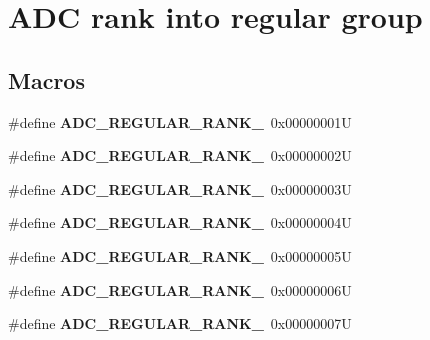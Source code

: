 \hypertarget{group___a_d_c__regular__rank}{}\section{A\+DC rank into regular group}
\label{group___a_d_c__regular__rank}
\subsection*{Macros}
\begin{DoxyCompactItemize}
\item 
\mbox{\label{group___a_d_c__regular__rank_gadf298d930c7a4f313ece62320dbd600c}} 
\#define {\bfseries A\+D\+C\+\_\+\+R\+E\+G\+U\+L\+A\+R\+\_\+\+R\+A\+N\+K\+\_}~0x00000001U
\item 
\mbox{\label{group___a_d_c__regular__rank_ga21f2593d1950de1b7f98770a21009826}} 
\#define {\bfseries A\+D\+C\+\_\+\+R\+E\+G\+U\+L\+A\+R\+\_\+\+R\+A\+N\+K\+\_}~0x00000002U
\item 
\mbox{\label{group___a_d_c__regular__rank_gadaab09acdc0504f6ed8a84d7de6170dc}} 
\#define {\bfseries A\+D\+C\+\_\+\+R\+E\+G\+U\+L\+A\+R\+\_\+\+R\+A\+N\+K\+\_}~0x00000003U
\item 
\mbox{\label{group___a_d_c__regular__rank_gae23fcbfa4f2a1c919038739cbcb57410}} 
\#define {\bfseries A\+D\+C\+\_\+\+R\+E\+G\+U\+L\+A\+R\+\_\+\+R\+A\+N\+K\+\_}~0x00000004U
\item 
\mbox{\label{group___a_d_c__regular__rank_ga288d36b6b6e483116ca423ee5709580e}} 
\#define {\bfseries A\+D\+C\+\_\+\+R\+E\+G\+U\+L\+A\+R\+\_\+\+R\+A\+N\+K\+\_}~0x00000005U
\item 
\mbox{\label{group___a_d_c__regular__rank_ga6636e3943689f2a196256c939b3aa5f5}} 
\#define {\bfseries A\+D\+C\+\_\+\+R\+E\+G\+U\+L\+A\+R\+\_\+\+R\+A\+N\+K\+\_}~0x00000006U
\item 
\mbox{\label{group___a_d_c__regular__rank_ga63bea206a722dd11460d09b619aa4145}} 
\#define {\bfseries A\+D\+C\+\_\+\+R\+E\+G\+U\+L\+A\+R\+\_\+\+R\+A\+N\+K\+\_}~0x00000007U

\end{DoxyCompactItemize}
